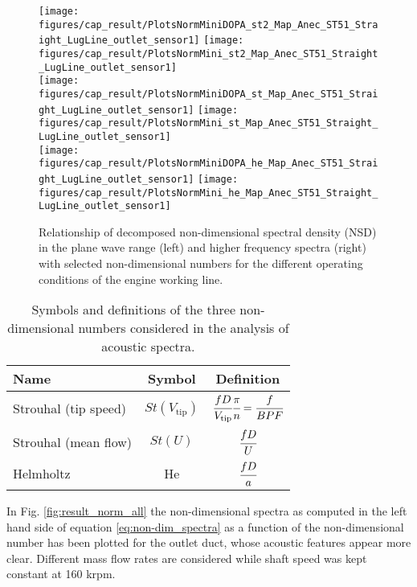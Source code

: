\begin{figure}[tb!]
\centering
\texttt{[image: figures/cap\_result/PlotsNormMiniDOPA\_st2\_Map\_Anec\_ST51\_Straight\_LugLine\_outlet\_sensor1]}\hspace{3mm}
\texttt{[image: figures/cap\_result/PlotsNormMini\_st2\_Map\_Anec\_ST51\_Straight\_LugLine\_outlet\_sensor1]}\\[4mm]
\texttt{[image: figures/cap\_result/PlotsNormMiniDOPA\_st\_Map\_Anec\_ST51\_Straight\_LugLine\_outlet\_sensor1]}\hspace{3mm}
\texttt{[image: figures/cap\_result/PlotsNormMini\_st\_Map\_Anec\_ST51\_Straight\_LugLine\_outlet\_sensor1]}\\[4mm]
\texttt{[image: figures/cap\_result/PlotsNormMiniDOPA\_he\_Map\_Anec\_ST51\_Straight\_LugLine\_outlet\_sensor1]}\hspace{3mm}
\texttt{[image: figures/cap\_result/PlotsNormMini\_he\_Map\_Anec\_ST51\_Straight\_LugLine\_outlet\_sensor1]}
\caption{Relationship of decomposed non-dimensional spectral density (NSD) in the plane wave range (left) and higher frequency spectra (right) with selected non-dimensional numbers for the different operating conditions of the engine working line.}
\label{fig:result_norm_all_LL}
\end{figure}


\begin{table}
\centering
\caption{Symbols and definitions of the three non-dimensional numbers considered in the analysis of acoustic spectra.}
\footnotesize
\begin{tabular}{lcc}
\toprule
\textbf{Name} & \textbf{Symbol} & \textbf{Definition}\\\midrule
Strouhal (tip speed)& $St(V_\text{tip})$ & $\cfrac{f D}{V_\text{tip}}\cfrac{\pi}{n}=\cfrac{f}{BPF}$ \\[4mm]
Strouhal (mean flow) & $St(U)$ & $\cfrac{f D}{U}$ \\[4mm]
Helmholtz & He & $\cfrac{f D}{a}$ \\[2mm] \bottomrule
\end{tabular}
\label{tab:nondim_numbers}
\end{table}

In Fig. \ref{fig:result_norm_all} the non-dimensional spectra as computed in the left hand side of equation \ref{eq:non-dim_spectra} as a function of the non-dimensional number has been plotted for the outlet duct, whose acoustic features appear more clear. Different mass flow rates are considered while shaft speed was kept constant at 160 krpm. 

